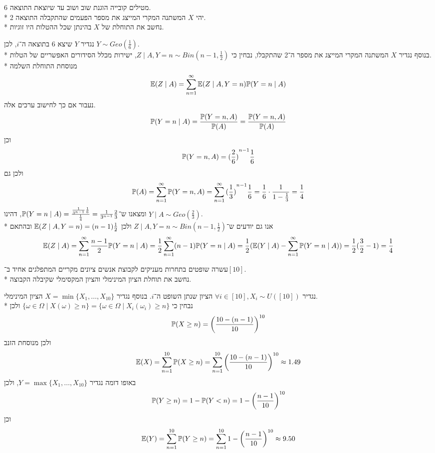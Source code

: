 \subquestion{}
מטילים קובייה הוגנת שוב ושוב עד שיוצאת התוצאה 6. \\*
יהי $X$ המשתנה המקרי המייצג את מספר הפעמים שהתקבלה התוצאה 2. \\*
נחשב את התוחלת של $X$ בהינתן שכל ההטלות היו זוגיות.
\begin{solution}
	נגדיר $Y$ שיצא 6 בתוצאה ה־$i$, לכן $Y \sim Geo(\frac{1}{6})$. \\*
	בנוסף נגדיר $X$ המשתנה המקרי המייצג את מספר ה־2 שהתקבלו, נבחין כי $Z \mid A, Y = n \sim Bin(n - 1, \frac{1}{2})$, ישירות מכלל הסידורים האפשריים של הטלות. \\*
	מנוסחת התוחלת השלמה
	\[
		\mathbb{E}(Z \mid A)
		= \sum_{n = 1}^{\infty} \mathbb{E}(Z \mid A, Y = n) \mathbb{P}(Y = n \mid A)
	\]
	נעבור אם כך לחישוב ערכים אלה.
	\[
		\mathbb{P}(Y = n \mid A)
		= \frac{\mathbb{P}(Y = n, A)}{\mathbb{P}(A)}
		= \frac{\mathbb{P}(Y = n, A)}{\mathbb{P}(A)}
	\]
	וכן
	\[
		\mathbb{P}(Y = n, A)
		= {(\frac{2}{6})}^{n - 1} \frac{1}{6}
	\]
	ולכן גם
	\[
		\mathbb{P}(A)
		= \sum_{n = 1}^{\infty} \mathbb{P}(Y = n, A)
		= \sum_{n = 1}^{\infty} {(\frac{1}{3})}^{n - 1} \frac{1}{6}
		= \frac{1}{6} \cdot \frac{1}{1 - \frac{1}{3}}
		= \frac{1}{4}
	\]
	ומצאנו ש־$\mathbb{P}(Y = n \mid A) = \frac{\frac{1}{3^{n - 1}} \frac{1}{6}}{\frac{1}{4}} = \frac{1}{3^{n - 1}} \frac{2}{3}$, דהינו $Y \mid A \sim Geo(\frac{2}{3})$. \\*
	אנו גם יודעים ש־$Z \mid A, Y = n \sim Bin(n - 1, \frac{1}{2})$ ולכן $\mathbb{E}(Z \mid A, Y = n) = (n - 1) \frac{1}{2}$ ובהתאם
	\[
		\mathbb{E}(Z \mid A)
		= \sum_{n = 1}^{\infty} \frac{n - 1}{2} \mathbb{P}(Y = n \mid A)
		= \frac{1}{2} \sum_{n = 1}^{\infty} (n - 1) \mathbb{P}(Y = n \mid A)
		= \frac{1}{2} (\mathbb{E}(Y \mid A) - \sum_{n = 1}^{\infty} \mathbb{P}(Y = n \mid A))
		= \frac{1}{2} (\frac{3}{2} - 1)
		= \frac{1}{4}
	\]
\end{solution}

\subquestion{}
עשרה שופטים בתחרות מעניקים לקבוצת אנשים ציונים מקריים המתפלגים אחיד ב־$[10]$. \\*
נחשב את תוחלת הציון המינימלי והציון המקסימלי שקיבלה הקבוצה.
\begin{solution}
	נגדיר $\forall i \in [10], X_i \sim U([10])$ הציון שנתן השופט ה־$i$. בנוסף נגדיר $X = \min\{ X_1, \dots, X_{10} \}$ הציון המינימלי. \\*
	נבחין כי $\{ \omega \in \Omega \mid X(\omega) \ge n \} = \{ \omega \in \Omega \mid X_i(\omega_i) \ge n \}$ ולכן
	\[
		\mathbb{P}(X \ge n)
		= {\left(\frac{10 - (n - 1)}{10}\right)}^{10}
	\]
	ולכן מנוסחת הזנב
	\[
		\mathbb{E}(X)
		= \sum_{n = 1}^{10} \mathbb{P}(X \ge n)
		= \sum_{n = 1}^{10} {\left(\frac{10 - (n - 1)}{10}\right)}^{10}
		\approx 1.49
	\]
	באופו דומה נגדיר $Y = \max\{ X_1, \dots, X_{10} \}$, ולכן
	\[
		\mathbb{P}(Y \ge n)
		= 1 - \mathbb{P}(Y < n)
		= 1 - {\left(\frac{n - 1}{10}\right)}^{10}
	\]
	וכן
	\[
		\mathbb{E}(Y)
		= \sum_{n = 1}^{10} \mathbb{P}(Y \ge n)
		= \sum_{n = 1}^{10} 1 - {\left(\frac{n - 1}{10}\right)}^{10}
		\approx 9.50
	\]
\end{solution}

